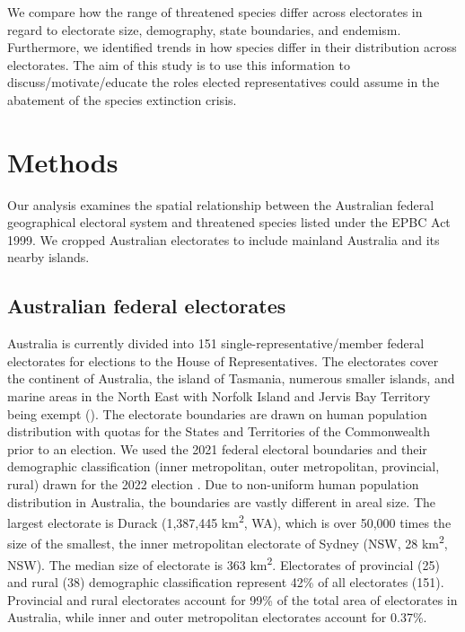 \documentclass[a4paper,11pt]{article}
\begin{document}
We compare how the range of threatened species differ across electorates in regard to electorate size, demography, state boundaries, and endemism. Furthermore, we identified trends in how species differ in their distribution across electorates. The aim of this study is to use this information to discuss/motivate/educate the roles elected representatives could assume in the abatement of the species extinction crisis.

\section{Methods}

Our analysis examines the spatial relationship between the Australian federal geographical electoral system and threatened species listed under the EPBC Act 1999. We cropped Australian electorates to include mainland Australia and its nearby islands.


\subsection{Australian federal electorates}

Australia is currently divided into 151 single-representative/member federal electorates for elections to the House of Representatives. The electorates cover the continent of Australia, the island of Tasmania, numerous smaller islands, and marine areas in the North East with Norfolk Island and Jervis Bay Territory being exempt (\cite{parliamentofaustraliaElectoralDivisions2018}). The electorate boundaries are drawn on human population distribution with quotas for the States and Territories of the Commonwealth prior to an election.
We used the 2021 federal electoral boundaries and their demographic classification (inner metropolitan, outer metropolitan, provincial, rural) drawn for the 2022 election \cite{australiaelectoralcomissionFederalElectoralBoundaries2019}. Due to non-uniform human population distribution in Australia, the boundaries are vastly different in areal size. The largest electorate is Durack (1,387,445 km\textsuperscript{2}, WA), which is over 50,000 times the size of the smallest, the inner metropolitan electorate of Sydney (NSW, 28 km\textsuperscript{2}, NSW). The median size of electorate is 363 km\textsuperscript{2}. Electorates of provincial (25) and rural (38) demographic classification represent 42\% of all electorates (151). Provincial and rural electorates account for 99\% of the total area of electorates in Australia, while inner and outer metropolitan electorates account for 0.37\%.
\end{document}
